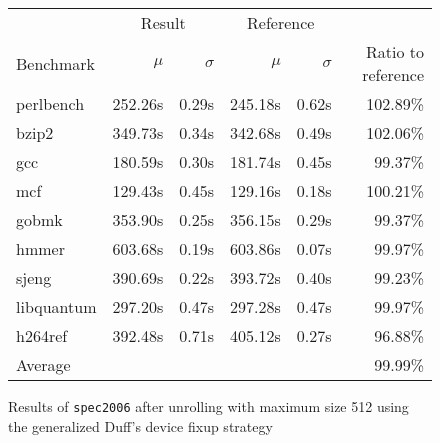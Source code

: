 \begin{figure}[th]
    \begin{center}
        \begin{tabular}{lrrrrr}
            \toprule
            & \multicolumn{2}{c}{Result} & \multicolumn{2}{c}{Reference}\\
            Benchmark & $\mu$ & $\sigma$ & $\mu$ & $\sigma$ & Ratio to reference\\
            \midrule
            perlbench & 252.26s & 0.29s & 245.18s & 0.62s & 102.89\%\\
            bzip2 & 349.73s & 0.34s & 342.68s & 0.49s & 102.06\%\\
            gcc & 180.59s & 0.30s & 181.74s & 0.45s & 99.37\%\\
            mcf & 129.43s & 0.45s & 129.16s & 0.18s & 100.21\%\\
            gobmk & 353.90s & 0.25s & 356.15s & 0.29s & 99.37\%\\
            hmmer & 603.68s & 0.19s & 603.86s & 0.07s & 99.97\%\\
            sjeng & 390.69s & 0.22s & 393.72s & 0.40s & 99.23\%\\
            libquantum & 297.20s & 0.47s & 297.28s & 0.47s & 99.97\%\\
            h264ref & 392.48s & 0.71s & 405.12s & 0.27s & 96.88\%\\
            \midrule
            Average & & & & & 99.99\%\\
            \bottomrule
        \end{tabular}
    \end{center}
    \caption{Results of \texttt{spec2006} after unrolling with maximum size 512 using the generalized Duff's device fixup strategy}
    \label{fig:eval:perf:duff:512}
\end{figure}
